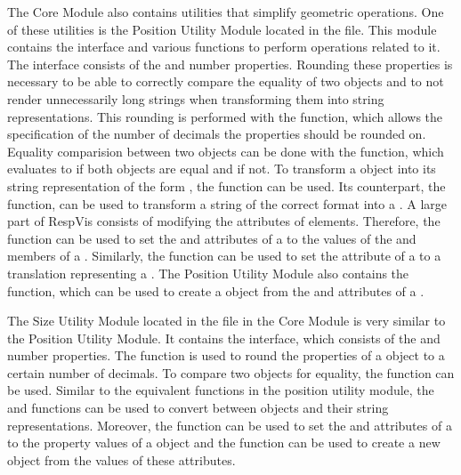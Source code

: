 The Core Module also contains utilities that simplify geometric operations.
One of these utilities is the Position Utility Module located in the  file.
This module contains the  interface and various functions to perform operations related to it.
The  interface consists of the  and  number properties.
Rounding these properties is necessary to be able to correctly compare the equality of two  objects and to not render unnecessarily long strings when transforming them into string representations.
This rounding is performed with the  function, which allows the specification of the number of decimals the properties should be rounded on.
Equality comparision between two  objects can be done with the  function, which evaluates to  if both  objects are equal and  if not.
To transform a  object into its string representation of the form , the  function can be used.
Its counterpart, the  function, can be used to transform a string of the correct format into a .
A large part of RespVis consists of modifying the attributes of elements.
Therefore, the  function can be used to set the  and  attributes of a  to the values of the  and  members of a .
Similarly, the  function can be used to set the  attribute of a  to a translation representing a .
The Position Utility Module also contains the  function, which can be used to create a  object from the  and  attributes of a .

The Size Utility Module located in the  file in the Core Module is very similar to the Position Utility Module.
It contains the  interface, which consists of the  and  number properties.
The  function is used to round the properties of a  object to a certain number of decimals.
To compare two  objects for equality, the  function can be used.
Similar to the equivalent functions in the position utility module, the  and  functions can be used to convert between  objects and their string representations.
Moreover, the  function can be used to set the  and  attributes of a  to the property values of a  object and the  function can be used to create a new  object from the values of these attributes.

